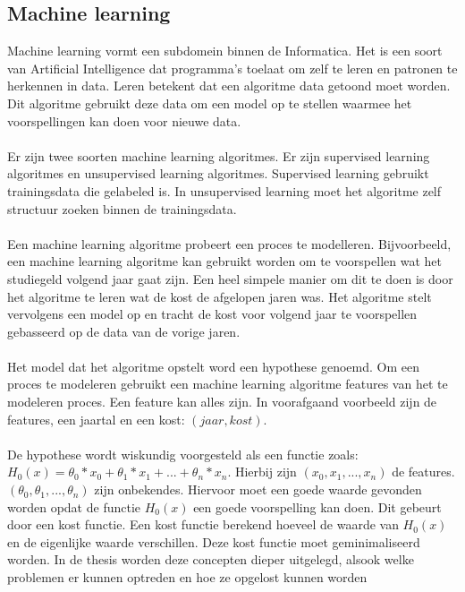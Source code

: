 \begin{samenvatting}
\section{Machine learning}
Machine learning vormt een subdomein binnen de Informatica. Het is een soort van Artificial Intelligence dat programma's toelaat om zelf te leren en patronen te herkennen in data. Leren betekent dat een algoritme data getoond moet worden. Dit algoritme gebruikt deze data om een model op te stellen waarmee het voorspellingen kan doen voor nieuwe data. \\
\\
Er zijn twee soorten machine learning algoritmes. Er zijn supervised learning algoritmes en unsupervised learning algoritmes. Supervised learning gebruikt trainingsdata die gelabeled is. In unsupervised learning moet het algoritme zelf structuur zoeken binnen de trainingsdata. \\
\\
Een machine learning algoritme probeert een proces te modelleren. Bijvoorbeeld, een machine learning algoritme kan gebruikt worden om te voorspellen wat het studiegeld volgend jaar gaat zijn. Een heel simpele manier om dit te doen is door het algoritme te leren wat de kost de afgelopen jaren was. Het algoritme stelt vervolgens een model op en tracht de kost voor volgend jaar te voorspellen gebasseerd op de data van de vorige jaren. \\
\\
Het model dat het algoritme opstelt word een hypothese genoemd. Om een proces te modeleren gebruikt een machine learning algoritme features van het te modeleren proces. Een feature kan alles zijn. In voorafgaand voorbeeld zijn de features, een jaartal en een kost: $(jaar, kost)$. \\
\\
De hypothese wordt wiskundig voorgesteld als een functie zoals: $H_0(x) = \theta_0 * x_0 + \theta_1 * x_1 + ... + \theta_n * x_n$. Hierbij zijn $(x_0, x_1, ..., x_n)$ de features. $(\theta_0, \theta_1, ..., \theta_n)$ zijn onbekendes. Hiervoor moet een goede waarde gevonden worden opdat de functie $H_0(x)$ een goede voorspelling kan doen. Dit gebeurt door een kost functie. Een kost functie berekend hoeveel de waarde van $H_0(x)$ en de eigenlijke waarde verschillen. Deze kost functie moet geminimaliseerd worden. In de thesis worden deze concepten dieper uitgelegd, alsook welke problemen er kunnen optreden en hoe ze opgelost kunnen worden\\
\\

\end{samenvatting}

